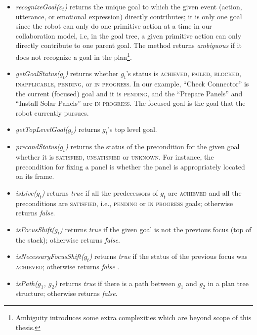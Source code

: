 \documentclass[12pt]{report}
\begin{document}
\begin{itemize}
  \setlength\itemsep{1mm}
  \item \textit{recognizeGoal($\varepsilon_t$)} returns the unique goal to which
  the given event (action, utterance, or emotional expression) directly
  contributes; it is only one goal since the robot can only do one primitive
  action at a time in our collaboration model, i.e, in the goal tree, a given
  primitive action can only directly contribute to one parent goal. The method
  returns \textit{ambiguous} if it does not recognize a goal in the
  plan\footnote{Ambiguity introduces some extra complexities which are beyond
  scope of this thesis.}.
  
  \item \textit{getGoalStatus($g_t$)} returns whether $g_t$'s status is
  \textsc{achieved, failed, blocked, inapplicable, pending,} or \textsc{in
  progress}. In our example, ``Check Connector'' is the current (focused) goal
  and it is \textsc{pending}, and the ``Prepare Panels'' and ``Install Solar
  Panels'' are \textsc{in progress}. The focused goal is the goal that the robot
  currently pursues.
  
  \item \textit{getTopLevelGoal($g_t$)} returns $g_t$'s top level goal.

  \item \textit{precondStatus($g_t$)} returns the status of the precondition for
  the given goal whether it is \textsc{satisfied, unsatisfied} or
  \textsc{unknown}. For instance, the precondition for fixing a panel is whether
  the panel is appropriately located on its frame.
  
  \item \textit{isLive($g_t$)} returns \textit{true} if all the predecessors of
  $g_t$ are \textsc{achieved} and all the preconditions are \textsc{satisfied},
  i.e., \textsc{pending} or \textsc{in progress} goals; otherwise returns
  \textit{false}.
  
  \item \textit{isFocusShift($g_t$)} returns \textit{true} if the given
  goal is not the previous focus (top of the stack); otherwise returns
  \textit{false}.
  
  \item \textit{isNecessaryFocusShift($g_t$)} returns \textit{true} if the
  status of the previous focus was \textsc{achieved}; otherwise returns
  \textit{false} \cite{rich:focused-unfocused-users}.
  
  \item \textit{isPath($g_1$, $g_2$)} returns \textit{true} if there is a path
  between $g_1$ and $g_2$ in a plan tree structure; otherwise returns
  \textit{false}.
  

\end{itemize}
\end{document}
